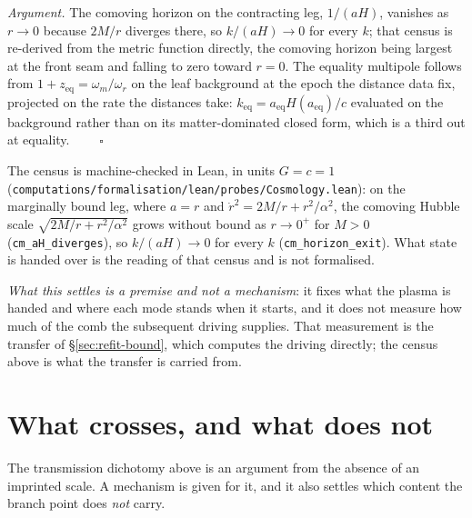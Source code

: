 \documentclass[11pt,a4paper]{article}
\theoremstyle{plain}
\theoremstyle{definition}
\theoremstyle{remark}
\begin{document}
\noindent\emph{Argument.} The comoving horizon on the contracting leg, $1/(aH)$, vanishes as $r\to0$ because $2M/r$ diverges there, so $k/(aH)\to0$ for every $k$; that census is re-derived from the metric function directly, the comoving horizon being largest at the front seam and falling to zero toward $r=0$. The equality multipole follows from $1+z_{\mathrm{eq}}=\omega_m/\omega_r$ on the leaf background at the epoch the distance data fix, projected on the rate the distances take: $k_{\mathrm{eq}}=a_{\mathrm{eq}}H(a_{\mathrm{eq}})/c$ evaluated on the background rather than on its matter-dominated closed form, which is a third out at equality. $\qquad\square$

The census is machine-checked in Lean, in units $G=c=1$ (\texttt{computations/formalisation/lean/probes/Cosmology.lean}): on the marginally bound leg, where $a=r$ and $\dot r^{2}=2M/r+r^{2}/\alpha^{2}$, the comoving Hubble scale $\sqrt{2M/r+r^{2}/\alpha^{2}}$ grows without bound as $r\to0^{+}$ for $M>0$ (\texttt{cm\_aH\_diverges}), so $k/(aH)\to0$ for every $k$ (\texttt{cm\_horizon\_exit}). What state is handed over is the reading of that census and is not formalised.

\emph{What this settles is a premise and not a mechanism}: it fixes what the plasma is handed and where each mode stands when it starts, and it does not measure how much of the comb the subsequent driving supplies. That measurement is the transfer of \S\ref{sec:refit-bound}, which computes the driving directly; the census above is what the transfer is carried from.

\section{What crosses, and what does not}\label{sec:what-crosses}

The transmission dichotomy above is an argument from the absence of an imprinted scale. A mechanism is given for it, and it also settles which content the branch point does \emph{not} carry.
\end{document}
